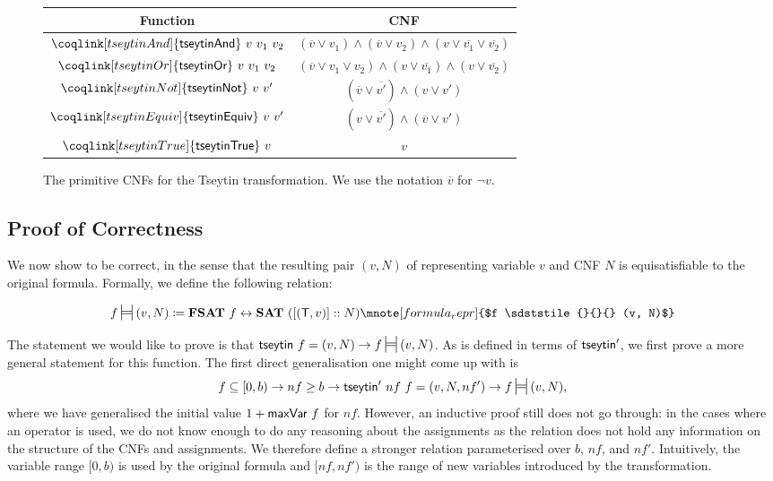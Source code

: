 \begin{figure}
  \begin{center}
    \begin{tabular}{c|c} 
      Function & CNF \\
      \midrule{}
      $\coqlink[tseytinAnd]{\textsf{tseytinAnd}}~v~v_1~v_2$ & $(\overline{v} \lor v_1) \land (\overline{v} \lor v_2) \land (v \lor \overline{v_1} \lor \overline{v_2})$ \\
      $\coqlink[tseytinOr]{\textsf{tseytinOr}}~v~v_1~v_2$ & $(\overline{v} \lor v_1 \lor v_2) \land (v \lor \overline{v_1}) \land (v \lor \overline{v_2})$ \\
      $\coqlink[tseytinNot]{\textsf{tseytinNot}}~v~v'$ & $(\overline{v} \lor \overline{v'}) \land (v \lor v')$ \\
      $\coqlink[tseytinEquiv]{\textsf{tseytinEquiv}}~v~v'$ & $(v \lor \overline{v'}) \land (\overline{v} \lor v')$ \\
      $\coqlink[tseytinTrue]{\textsf{tseytinTrue}}~v$ & $v$ 
    \end{tabular}
  \end{center}
  \caption{The primitive CNFs for the Tseytin transformation. We use the notation $\overline{v}$ for $\lnot v$.}\label{fig:prim_cnfs}
\end{figure}

\subsection{Proof of Correctness}
We now show \tseytin{} to be correct, in the sense that the resulting pair $(v, N)$ of representing variable $v$ and CNF $N$ is equisatisfiable to the original formula. Formally, we define the following relation:
\newcommand{\frepr}{\sdststile{}{}}
\begin{definition}
  \[ f \frepr{} (v, N) \defeq \fsat{}~f \leftrightarrow \SAT{}~([(\btrue, v)] :: N) \mnote[formula_repr]{$f \frepr{} (v, N)$}\]
\end{definition}

The statement we would like to prove is that $\tseytin~f = (v, N) \rightarrow f \frepr{} (v, N)$. As \tseytin{} is defined in terms of $\textsf{tseytin}'$, we first prove a more general statement for this function. The first direct generalisation one might come up with is
\[f \subseteq [0, b) \rightarrow nf \ge b \rightarrow \tseytin'~nf~f = (v, N, nf') \rightarrow f \frepr{} (v, N), \]
where we have generalised the initial value $1 +{\textsf{maxVar}~f}$ for $nf$.
However, an inductive proof still does not go through: in the cases where an operator is used, we do not know enough to do any reasoning about the assignments as the relation does not hold any information on the structure of the CNFs and assignments. 
We therefore define a stronger relation parameterised over $b$, $nf$, and $nf'$. Intuitively, the variable range $[0, b)$ is used by the original formula and $[nf, nf')$ is the range of new variables introduced by the transformation.

